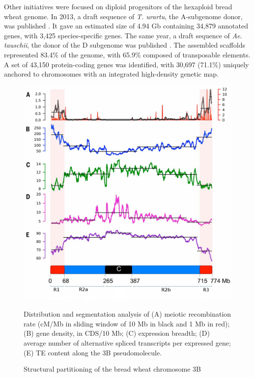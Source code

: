 \documentclass[a4paper, 12pt]{article}
\begin{document}
\begin{onehalfspace}
Other initiatives were focused on diploid progenitors of the hexaploid bread wheat genome. In 2013, a draft sequence of \textit{T. urartu}, the A-subgenome donor, was published \citep{Ling2013}. It gave an estimated size of 4.94 Gb containing 34,879 annotated genes, with 3,425 species-specific genes. The same year, a draft sequence of \textit{Ae. tauschii}, the donor of the D subgenome was published \citep{Jia2013}. The assembled scaffolds represented 83.4\% of the genome, with 65.9\% composed of transposable elements. A set of 43,150 protein-coding genes was identified, with 30,697 (71.1\%) uniquely anchored to chromosomes with an integrated high-density genetic map.

\newpage %
\thispagestyle{empty}
    \begin{figure}
      \centering \includegraphics[scale=1.3]{Figures/Figure_1.jpg}
      \vspace{0.5cm}
      \caption{Structural partitioning of the bread wheat chromosome 3B}
      \label{fig:F1}
    \footnotesize{Distribution and segmentation analysis of (A) meiotic recombination rate (cM/Mb in sliding window of 10 Mb in black and 1 Mb in red); (B) gene density, in CDS/10 Mb; (C) expression breadth; (D) average number of alternative spliced transcripts per expressed gene; (E) TE content along the 3B pseudomolecule. 
    
}
\end{figure}
\end{onehalfspace}
\end{document}

